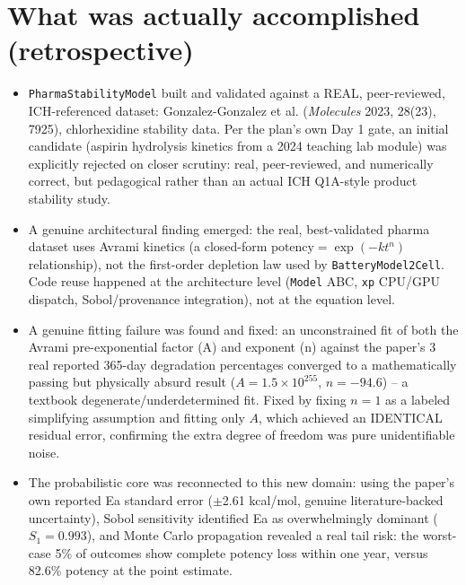\documentclass[11pt]{article}
\begin{document}
\section*{What was actually accomplished (retrospective)}

\begin{itemize}[leftmargin=*]
  \item \texttt{PharmaStabilityModel} built and validated against a
    REAL, peer-reviewed, ICH-referenced dataset: Gonzalez-Gonzalez et
    al. (\emph{Molecules} 2023, 28(23), 7925), chlorhexidine stability
    data. Per the plan's own Day 1 gate, an initial candidate
    (aspirin hydrolysis kinetics from a 2024 teaching lab module) was
    explicitly rejected on closer scrutiny: real, peer-reviewed, and
    numerically correct, but pedagogical rather than an actual
    ICH Q1A-style product stability study.
  \item A genuine architectural finding emerged: the real,
    best-validated pharma dataset uses Avrami kinetics (a closed-form
    $\text{potency} = \exp(-k t^n)$ relationship), not the first-order
    depletion law used by \texttt{BatteryModel2Cell}. Code reuse
    happened at the architecture level (\texttt{Model} ABC,
    \texttt{xp} CPU/GPU dispatch, Sobol/provenance integration), not
    at the equation level.
  \item A genuine fitting failure was found and fixed: an
    unconstrained fit of both the Avrami pre-exponential factor (A)
    and exponent (n) against the paper's 3 real reported 365-day
    degradation percentages converged to a mathematically passing but
    physically absurd result ($A = 1.5 \times 10^{255}$,
    $n = -94.6$) -- a textbook degenerate/underdetermined fit. Fixed
    by fixing $n=1$ as a labeled simplifying assumption and fitting
    only $A$, which achieved an IDENTICAL residual error, confirming
    the extra degree of freedom was pure unidentifiable noise.
  \item The probabilistic core was reconnected to this new domain:
    using the paper's own reported Ea standard error ($\pm$2.61
    kcal/mol, genuine literature-backed uncertainty), Sobol
    sensitivity identified Ea as overwhelmingly dominant
    ($S_1 = 0.993$), and Monte Carlo propagation revealed a real tail
    risk: the worst-case 5\% of outcomes show complete potency loss
    within one year, versus 82.6\% potency at the point estimate.
\end{itemize}
\end{document}
